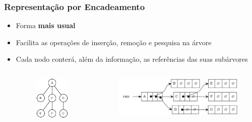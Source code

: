 \documentclass[aspectratio=169]{beamer}
\begin{document}
\begin{frame}[fragile]\frametitle{Representação por Encadeamento}
\begin{itemize}
	\item Forma \textbf{mais usual}
	\item Facilita as operações de inserção, remoção e pesquisa na árvore
	\item Cada nodo conterá, além da informação, as referências das suas subárvores
\begin{columns}[T]
\begin{column}{0.30\linewidth}
\begin{figure}[h]
	\centering
	\includegraphics[height=0.4\paperheight]{imagens/arvore_a.eps}
\end{figure}
\end{column}
\begin{column}{0.70\linewidth}
\begin{figure}[h]
	\centering
	\includegraphics[height=0.35\paperheight]{imagens/arvore_a-enc.png}
\end{figure}
\end{column}
\end{columns}
\end{itemize}
\end{frame}
\end{document}
